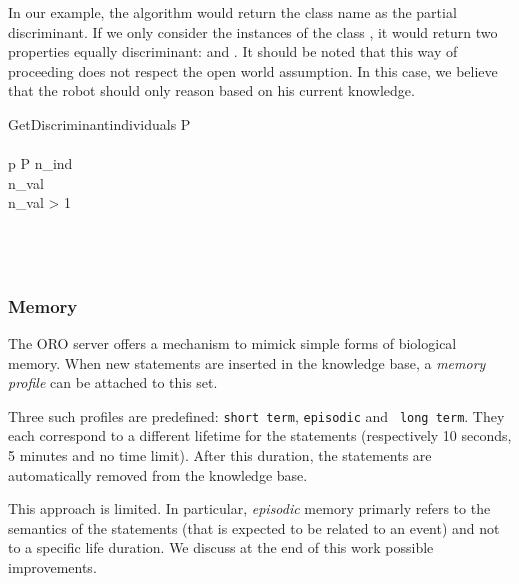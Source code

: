 In our example, the algorithm would return the class name as the partial
discriminant. If we only consider the instances of the class ,
it would return two properties equally discriminant:  and
. It should be noted that this way of proceeding does not respect
the open world assumption. In this case, we believe that the robot should only
reason based on his current knowledge.

\small
\begin{pseudocode}[ruled]{GetDiscriminant}{individuals}
\label{algo|discriminant}
\BEGIN
P \GETS {} \\
 \GETS \emptyset \\
\FOREACH p \in P \DO
    \BEGIN
        n_{ind} \GETS {} \\
        n_{val} \GETS {} \\
        \IF n_{val} > 1 \THEN
             \GETS {} \\
    \END \\

 \\
 \\
\END

\end{pseudocode}
\normalsize


\subsubsection{Memory}
\label{sect|oroserver-memory}

The ORO server offers a mechanism to mimick simple forms of biological memory.
When new statements are inserted in the knowledge base, a \emph{memory profile}
can be attached to this set.

Three such profiles are predefined: {\tt short term}, {\tt episodic} and {\tt
long term}. They each correspond to a different lifetime for the statements
(respectively 10 seconds, 5 minutes and no time limit). After this duration,
the statements are automatically removed from the knowledge base.

This approach is limited. In particular, \emph{episodic} memory primarly refers
to the semantics of the statements (that is expected to be related to an event)
and not to a specific life duration. We discuss at the end of this work possible
improvements.

